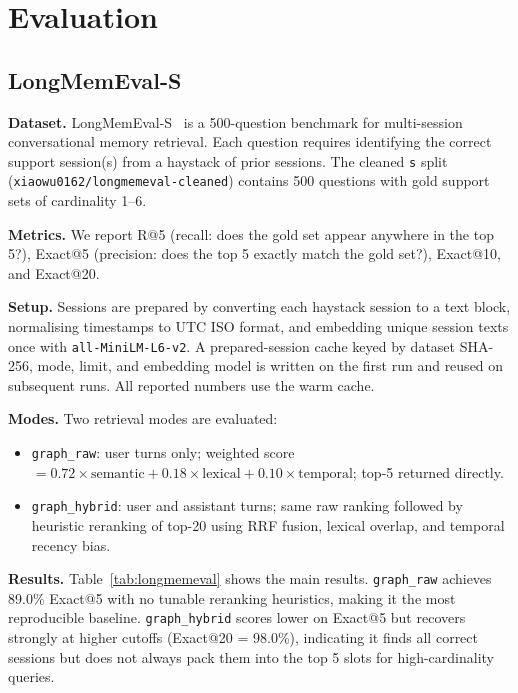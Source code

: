 \documentclass[conference]{IEEEtran}
\begin{document}
\section{Evaluation}

\subsection{LongMemEval-S}

\textbf{Dataset.} LongMemEval-S~\cite{wu2024longmemeval} is a 500-question benchmark for
multi-session conversational memory retrieval. Each question requires identifying the correct
support session(s) from a haystack of prior sessions. The cleaned \texttt{s} split
(\texttt{xiaowu0162/longmemeval-cleaned}) contains 500 questions with gold support sets of
cardinality 1--6.

\textbf{Metrics.} We report R@5 (recall: does the gold set appear anywhere in the top 5?),
Exact@5 (precision: does the top 5 exactly match the gold set?), Exact@10, and Exact@20.

\textbf{Setup.} Sessions are prepared by converting each haystack session to a text block,
normalising timestamps to UTC ISO format, and embedding unique session texts once with
\texttt{all-MiniLM-L6-v2}. A prepared-session cache keyed by dataset SHA-256, mode, limit,
and embedding model is written on the first run and reused on subsequent runs. All reported
numbers use the warm cache.

\textbf{Modes.} Two retrieval modes are evaluated:
\begin{itemize}
\item \texttt{graph\_raw}: user turns only; weighted score $= 0.72 \times \text{semantic}
+ 0.18 \times \text{lexical} + 0.10 \times \text{temporal}$; top-5 returned directly.
\item \texttt{graph\_hybrid}: user and assistant turns; same raw ranking followed by heuristic
reranking of top-20 using RRF fusion, lexical overlap, and temporal recency bias.
\end{itemize}

\textbf{Results.} Table~\ref{tab:longmemeval} shows the main results.
\texttt{graph\_raw} achieves 89.0\% Exact@5 with no tunable reranking heuristics, making it
the most reproducible baseline. \texttt{graph\_hybrid} scores lower on Exact@5 but recovers
strongly at higher cutoffs (Exact@20 = 98.0\%), indicating it finds all correct sessions but
does not always pack them into the top 5 slots for high-cardinality queries.
\end{document}
